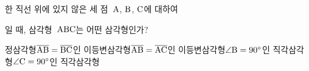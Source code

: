 한 직선 위에 있지 않은 세 점~$\mathrm{A}$, $\mathrm{B}$, $\mathrm{C}$에 대하여\par\smallskip{}\par\smallskip\noindent 일 때, 삼각형~$\mathrm{ABC}$는 어떤 삼각형인가?
\begin{choicesv}{정삼각형}{$\overline{\mathrm{AB}}=\overline{\mathrm{BC}}$인 이등변삼각형}{$\overline{\mathrm{AB}}=\overline{\mathrm{AC}}$인 이등변삼각형}{$\angle\mathrm{B}=90^\circ$인 직각삼각형}{$\angle\mathrm{C}=90^\circ$인 직각삼각형}\end{choicesv}
